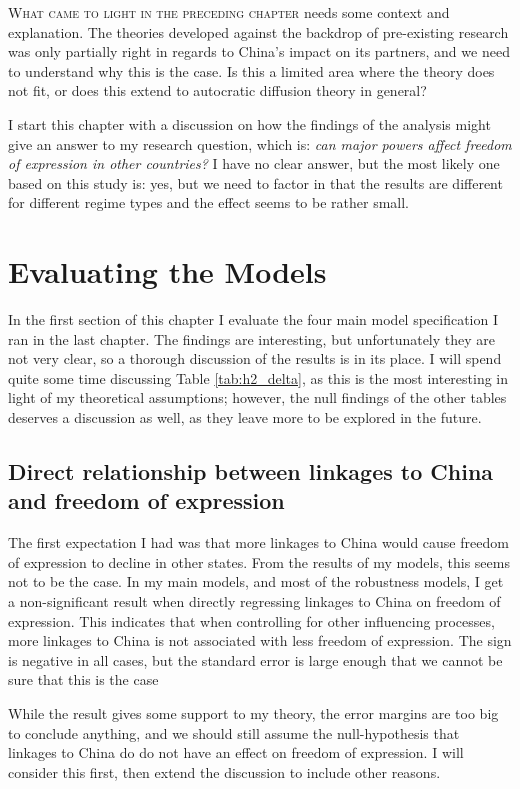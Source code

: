\lettrine{W}{hat came to light in the preceding chapter} needs some context and explanation. The theories developed against the backdrop of pre-existing research was only partially right in regards to China's impact on its partners, and we need to understand why this is the case. Is this a limited area where the theory does not fit, or does this extend to autocratic diffusion theory in general?

I start this chapter with a discussion on how the findings of the analysis might give an answer to my research question, which is: \textit{can major powers affect freedom of expression in other countries?} I have no clear answer, but the most likely one based on this study is: yes, but we need to factor in that the results are different for different regime types and the effect seems to be rather small.  

\section{Evaluating the Models}
In the first section of this chapter I evaluate the four main model specification I ran in the last chapter. The findings are interesting, but unfortunately they are not very clear, so a thorough discussion of the results is in its place. I will spend quite some time discussing Table \ref{tab:h2_delta}, as this is the most interesting in light of my theoretical assumptions; however, the null findings of the other tables deserves a discussion as well, as they leave more to be explored in the future.

\subsection{Direct relationship between linkages to China and freedom of expression}
The first expectation I had was that more linkages to China would cause freedom of expression to decline in other states. From the results of my models, this seems not to be the case. In my main models, and most of the robustness models, I get a non-significant result when directly regressing linkages to China on freedom of expression. This indicates that when controlling for other influencing processes, more linkages to China is not associated with less freedom of expression. The sign is negative in all cases, but the standard error is large enough that we cannot be sure that this is the case

While the result gives some support to my theory, the error margins are too big to conclude anything, and we should still assume the null-hypothesis that linkages to China do do not have an effect on freedom of expression. I will consider this first, then extend the discussion to include other reasons. 

